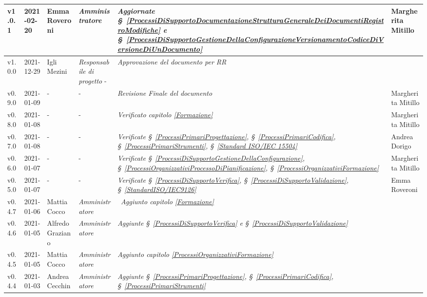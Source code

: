 {\begin{center}
\begin{longtable}[c]{|p{2cm-1\tabcolsep}|p{2cm}|p{3cm-2\tabcolsep}|p{3cm-1.5\tabcolsep}|p{}|p{3cm-2\tabcolsep}|}
		\hline
		\centering v1.0.1 & 2021-02-20 & Emma Roveroni & \centering \textit{Amministratore}  & \textit{Aggiornate  \S~\ref{ProcessiDiSupportoDocumentazioneStrutturaGeneraleDeiDocumentiRegistroModifiche} e \S~\ref{ProcessiDiSupportoGestioneDellaConfigurazioneVersionamentoCodiceDiVersioneDiUnDocumento}} & Margherita Mitillo \\
		\hline
		\centering v1.0.0 & 2021-12-29 & Igli Mezini & \centering \textit{Responsabile di progetto}  - & \textit{Approvazione del documento per RR} & \makecell[c]{-} \\
		\hline
		\centering v0.9.0 & 2021-01-09 & \centering - & \centering -  & \textit{Revisione Finale del documento} & Margherita Mitillo\\
		\hline
		\centering v0.8.0 & 2021-01-08 & \centering - & \centering -  & \textit{Verificato capitolo \ref{Formazione}} & Margherita Mitillo \\
		\hline
		\centering v0.7.0 & 2021-01-08 & \centering - & \centering -  & \textit{Verificate  \S~\ref{ProcessiPrimariProgettazione}, \S~\ref{ProcessiPrimariCodifica}, \S~\ref{ProcessiPrimariStrumenti}, \S~\ref{Standard ISO/IEC 15504} } & Andrea Dorigo \\
		\hline
		\centering v0.6.0 & 2021-01-07 & \centering - & \centering -  & \textit{Verificate  \S~\ref{ProcessiDiSupportoGestioneDellaConfigurazione}, \S~\ref{ProcessiOrganizzativiProcessoDiPianificazione}, \S~\ref{ProcessiOrganizzativiFormazione}} & Margherita Mitillo \\
		\hline
		\centering v0.5.0 & 2021-01-07 & \centering - & \centering -  & \textit{Verificate \S~\ref{ProcessiDiSupportoVerifica}, \S~\ref{ProcessiDiSupportoValidazione}, \S~\ref{StandardISO/IEC9126}} & Emma Roveroni \\
		\hline
		\centering v0.4.7 & 2021-01-06 & Mattia Cocco & \centering \textit{Amministratore}  & \	\textit{Aggiunto capitolo \ref{Formazione}} & \makecell[c]{-} \\
		\hline
		\centering v0.4.6 & 2021-01-05 & Alfredo Graziano & \centering \textit{Amministratore} &  \textit{Aggiunte  \S~\ref{ProcessiDiSupportoVerifica} e \S~\ref{ProcessiDiSupportoValidazione} } & \makecell[c]{-} \\
		\hline
		\centering v0.4.5 & 2021-01-05 & Mattia Cocco & \centering \textit{Amministratore}  & \textit{Aggiunto capitolo \ref{ProcessiOrganizzativiFormazione}}  & \makecell[c]{-}\\
		\hline
		\centering v0.4.4 & 2021-01-03 & Andrea Cecchin & \centering \textit{Amministratore} &  \textit{Aggiunte  \S~\ref{ProcessiPrimariProgettazione}, \S~\ref{ProcessiPrimariCodifica}, \S~\ref{ProcessiPrimariStrumenti}}  & \makecell[c]{-}\\

\end{longtable}
\end{center}}
